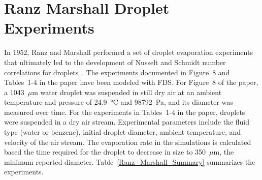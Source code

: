 \section{Ranz Marshall Droplet Experiments}
\label{Ranz_Marshall_Description}

In 1952, Ranz and Marshall performed a set of droplet evaporation experiments that ultimately led to the development of Nusselt and Schmidt number correlations for droplets~\cite{Ranz}. The experiments documented in Figure~8 and Tables~1-4 in the paper have been modeled with FDS. For Figure~8 of the paper, a 1043~$\mu$m water droplet was suspended in still dry air at an ambient temperature and pressure of 24.9~\unit{\degreeCelsius} and 98792~Pa, and its diameter was measured over time. For the experiments in Tables~1-4 in the paper, droplets were suspended in a dry air stream. Experimental parameters include the fluid type (water or benzene), initial droplet diameter, ambient temperature, and velocity of the air stream. The evaporation rate in the simulations is calculated based the time required for the droplet to decrease in size to 350~$\mu$m, the minimum reported diameter. Table~\ref{Ranz_Marshall_Summary} summarizes the experiments.

